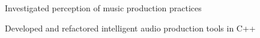 \documentclass[letterpaper]{deedy-resume} %
\begin{document}
{\begin{minipage}[t]{0.66\textwidth}




\hspace{-0.1cm}
\begin{tightitemize}
\item Investigated perception of music production practices
\item Developed and refactored intelligent audio production tools in C++
\end{tightitemize}


\end{minipage}}
\end{document}
